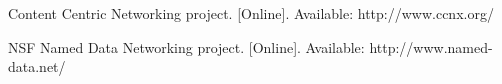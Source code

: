 \documentclass[10pt,conference]{./IEEEtran}
\begin{document}
\begin{thebibliography}{10}








Content Centric Networking project.
[Online]. Available:
http://www.ccnx.org/

NSF Named Data Networking project. [Online]. Available:
http://www.named-data.net/







\end{thebibliography}
\end{document}

